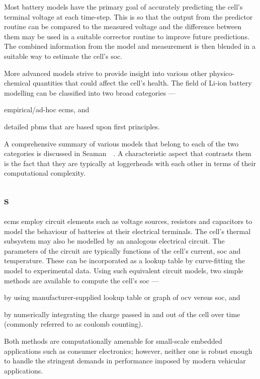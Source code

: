 Most battery  models have the primary  goal of accurately predicting  the cell's
terminal  voltage  at each  time-step.  This  is so  that  the  output from  the
predictor routine  can be compared  to the  measured voltage and  the difference
between  them may  be used  in a  suitable corrector  routine to  improve future
predictions. The  combined information  from the model  and measurement  is then
blended in a suitable way to estimate the cell's \gls{soc}.

More   advanced  models   strive   to  provide   insight   into  various   other
physico-chemical quantities  that could affect  the cell's health. The  field of
Li-ion battery modelling can be classified into two broad categories
---
\begin{enumerate*}[label=\roman*)]
    \item empirical/ad-hoc \glspl{ecm}, and
    \item detailed  \glspl{pbm} that are based  upon first principles.
\end{enumerate*}
A  comprehensive summary  of  various models  that  belong to  each  of the  two
categories  is  discussed  in Seaman~\etal~\cite{Seaman2014}.  A  characteristic
aspect that contrasts  them is the fact that they  are typically
at loggerheads with each other in terms of their computational complexity.

\subsection{s}\label{subsec:ecms}

\glspl{ecm}  employ circuit  elements  such as  voltage  sources, resistors  and
capacitors to  model the behaviour  of batteries at their  electrical terminals.
The cell's  thermal subsystem may  also be  modelled by an  analogous electrical
circuit. The  parameters of the  circuit are  typically functions of  the cell's
current, \gls{soc} and  temperature. These can be incorporated as  a lookup table by
curve-fitting  the model  to experimental  data. Using  such equivalent  circuit
models, two simple methods are available to compute the cell's \gls{soc} ---
\begin{enumerate*}[label=\itshape\alph*\upshape)]
    \item by using manufacturer-supplied  lookup table or graph of \gls{ocv} versus \gls{soc}, and
    \item by numerically integrating the charge passed in and out of the cell over time (commonly referred to as coulomb counting).
\end{enumerate*}
Both methods are computationally  amenable for small-scale embedded applications
such as  consumer electronics; however, neither  one is robust enough  to handle
the stringent demands in performance imposed by modern vehicular applications.

